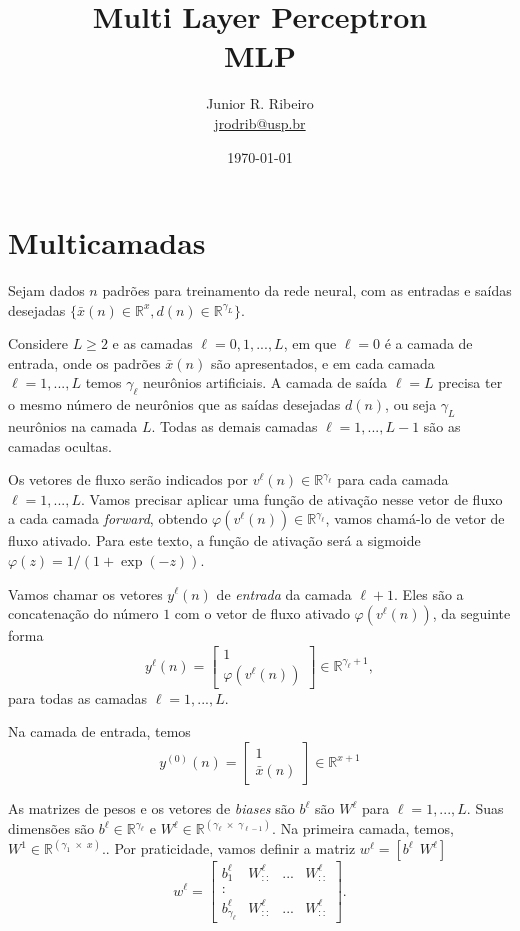 \documentclass[12pt,a4paper]{article}
\title{Multi Layer Perceptron\\MLP}
\author{Junior R. Ribeiro \\ \url{jrodrib@usp.br}}
\date{\today}
\def\RR{\mathbb{R}}
\begin{document}
\maketitle\tableofcontents

\section{Multicamadas}

Sejam dados $n$ padrões para treinamento da rede neural, com as entradas e saídas desejadas $\big\{\bar x(n)\in\RR^{x}, d(n)\in\RR^{\gamma_L}\big\}$.

Considere $L\ge2$ e as camadas $\ell=0,1,...,L$,
em que $\ell=0$ é a camada de entrada, onde os padrões $\bar x(n)$ são apresentados, e em cada camada $\ell=1,...,L$ temos $\gamma_\ell$ neurônios artificiais. A camada de saída $\ell=L$ precisa ter o mesmo número de neurônios que as saídas desejadas $d(n)$, ou seja $\gamma_L$ neurônios na camada $L$. Todas as demais camadas $\ell=1,...,L-1$ são as camadas ocultas.

Os vetores de fluxo serão indicados por $v^\ell(n) \in\RR^{\gamma_\ell}$ para cada camada $\ell=1,...,L$. Vamos precisar aplicar uma função de ativação nesse vetor de fluxo a cada camada \textit{forward}, obtendo $\varphi(v^\ell(n))\in\RR^{\gamma_\ell}$, vamos chamá-lo de vetor de fluxo ativado. Para este texto, a função de ativação será a sigmoide $\varphi(z)=1/(1+\exp(-z))$.

Vamos chamar os vetores $y^\ell(n)$ de \textit{entrada} da camada $\ell+1$. Eles são a concatenação do número $1$ com o vetor de fluxo ativado $\varphi(v^\ell(n))$, da seguinte forma
\[
y^\ell(n)=
\begin{bmatrix}
	1\\
	\varphi(v^\ell(n))
\end{bmatrix}\in\RR^{\gamma_\ell+1},
\]
para todas as camadas $\ell=1,...,L$.

Na camada de entrada, temos
\[
y^{(0)}(n)=
\begin{bmatrix}
1\\
\bar x(n)
\end{bmatrix}\in\RR^{x+1}
\]


As matrizes de pesos e os vetores de \textit{biases} são $b^\ell$ são $W^\ell$ para $\ell=1,...,L$. Suas dimensões são $b^\ell\in\RR^{\gamma_\ell}$ e $W^\ell\in\RR^{(\gamma_\ell\; \times\; \gamma_{\ell-1})}$. Na primeira camada, temos, $W^1\in\RR^{(\gamma_1 \;\times\; x)}$.. Por praticidade, vamos definir a matriz $w^\ell = [b^\ell \ \ W^\ell]$
\[
w^\ell = 
\begin{bmatrix}
	b_1^\ell & W_{::}^\ell & ... & W_{::}^\ell\\
	:\\
	b_{\gamma_\ell}^\ell & W_{::}^\ell & ... & W_{::}^\ell
\end{bmatrix}.
\]
\end{document}
